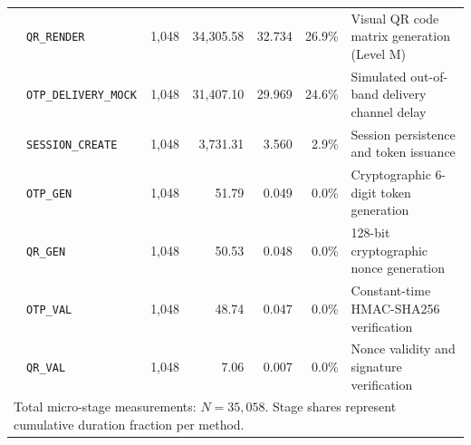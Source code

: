 \begin{table}[t]
\begin{tabular}{llrrrrl}
 & \texttt{QR_RENDER} & 1,048 & 34,305.58 & 32.734 & 26.9\% & Visual QR code matrix generation (Level M) \\
 & \texttt{OTP_DELIVERY_MOCK} & 1,048 & 31,407.10 & 29.969 & 24.6\% & Simulated out-of-band delivery channel delay \\
 & \texttt{SESSION_CREATE} & 1,048 & 3,731.31 & 3.560 & 2.9\% & Session persistence and token issuance \\
 & \texttt{OTP_GEN} & 1,048 & 51.79 & 0.049 & 0.0\% & Cryptographic 6-digit token generation \\
 & \texttt{QR_GEN} & 1,048 & 50.53 & 0.048 & 0.0\% & 128-bit cryptographic nonce generation \\
 & \texttt{OTP_VAL} & 1,048 & 48.74 & 0.047 & 0.0\% & Constant-time HMAC-SHA256 verification \\
 & \texttt{QR_VAL} & 1,048 & 7.06 & 0.007 & 0.0\% & Nonce validity and signature verification \\
\hline
\multicolumn{7}{l}{\footnotesize Total micro-stage measurements: $N = 35,058$. Stage shares represent cumulative duration fraction per method.} \\
\end{tabular}
\end{table}
